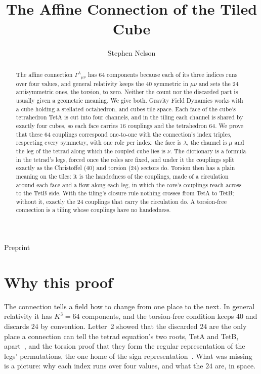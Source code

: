 \documentclass[twocolumn]{iopjournal}
\renewcommand{\articletype}[1]{%
  {\vspace*{-8mm}\noindent \Large \sf Preprint}\par
  \vspace*{6mm}\noindent{\scriptsize \sf{\bfseries \MakeUppercase{#1}}}}
\begin{document}
\articletype{Proof}

\title{The Affine Connection of the Tiled Cube}

\author{Stephen Nelson}



\begin{abstract}
The affine connection $\Gamma^\lambda{}_{\mu\nu}$ has 64 components
because each of its three indices runs over four values, and
general relativity keeps the 40 symmetric in $\mu\nu$ and sets the
24 antisymmetric ones, the torsion, to zero. Neither the count nor
the discarded part is usually given a geometric meaning. We give
both. Gravity Field Dynamics works with a cube holding a stellated
octahedron, and cubes tile space. Each face of the cube's
tetrahedron TetA is cut into four channels, and in the tiling each
channel is shared by exactly four cubes, so each face carries 16
couplings and the tetrahedron 64. We prove that these 64 couplings
correspond one-to-one with the connection's index triples, respecting
every symmetry, with one role per index: the face is $\lambda$, the
channel is $\mu$ and the leg of the tetrad along which the coupled
cube lies is $\nu$. The dictionary is a formula in the tetrad's legs,
forced once the roles are fixed, and under it the couplings split
exactly as the Christoffel ($40$) and torsion ($24$) sectors do.
Torsion then has a plain meaning on the tiles: it is the handedness
of the couplings, made of a circulation around each face and a flow
along each leg, in which the core's couplings reach across to the
TetB side. With the tiling's closure rule nothing crosses from TetA
to TetB; without it, exactly the 24 couplings that carry the
circulation do. A torsion-free connection is a tiling whose couplings
have no handedness.
\end{abstract}



\section*{Why this proof}

The connection tells a field how to change from one place to the
next. In general relativity it has $K^3 = 64$ components, and the
torsion-free condition keeps $40$ and discards $24$ by convention.
Letter~2 showed that the discarded $24$ are the only place a
connection can tell the tetrad equation's two roots, TetA and TetB,
apart~\cite{NelsonL2,NelsonGram}, and the torsion proof that they
form the regular representation of the legs' permutations, the one
home of the sign representation~\cite{NelsonTorsion}. What was
missing is a picture: why each index runs over four values, and what
the $24$ are, in space.
\end{document}
